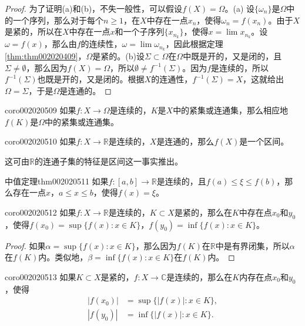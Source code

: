 \begin{proof}
为了证明(a)和(b)，不失一般性，可以假设$f(X) = \Omega$。(a) 设$\{\omega_n\}$是$\Omega$中的一个序列，那么对于每个$n \ge 1$，在$X$中存在一点$x_n$，使得$\omega_n = f(x_n)$。由于$X$是紧的，所以在$X$中存在一点$x$和一个子序列$\{x_{n_k}\}$，使得$x = \lim{x_{n_k}}$。设$\omega = f(x)$，那么由$f$的连续性，$\omega = \lim{\omega_{n_k}}$，因此根据定理\ref{thm:thm002020409}，$\Omega$是紧的。(b)设$\Sigma \subset \Omega$在$\Omega$中既是开的，又是闭的，且$\Sigma \neq \emptyset$，那么因为$f(X) = \Omega$，所以$\emptyset \neq f^{-1}(\Sigma)$。因为$f$是连续的，所以$f^{-1}(\Sigma)$也既是开的，又是闭的。根据$X$的连通性，$f^{-1}(\Sigma) = X$，这就给出$\Omega = \Sigma$，于是$\Omega$是连通的。
\end{proof}

\begin{corollary}{}{coro002020509}
如果$f:X \to \Omega$是连续的，$K$是$X$中的紧集或连通集，那么相应地$f(K)$是$\Omega$中的紧集或连通集。
\end{corollary}

\begin{corollary}{}{coro002020510}
如果$f:X \to \mathbb{R}$是连续的，$X$是连通的，那么$f(X)$是一个区间。
\end{corollary}

这可由$\mathbb{R}$的连通子集的特征是区间这一事实推出。

\begin{theorem}{中值定理}{thm002020511}
如果$f:[a, b] \to \mathbb{R}$是连续的，且$f(a) \le \xi \le f(b)$，那么存在一点$x$，$a \le x \le b$，使得$f(x) = \xi$。
\end{theorem}

\begin{corollary}{}{coro002020512}
如果$f:X \to \mathbb{R}$是连续的，$K \subset X$是紧的，那么在$K$中存在点$x_0$和$y_0$，使得$f(x_0) = \sup\{f(x):x \in K\}$，$f(y_0) = \inf\{f(x): x \in K\}$。
\end{corollary}

\begin{proof}
如果$\alpha = \sup\{f(x):x\in K\}$，那么因为$f(K)$在$\mathbb{R}$中是有界闭集，所以$\alpha$在$f(K)$内。类似地，$\beta = \inf\{f(x): x \in K\}$在$f(K)$内。
\end{proof}

\begin{corollary}{}{coro002020513}
如果$K \subset X$是紧的，$f: X \to \mathbb{C}$是连续的，那么在$K$内存在点$x_0$和$y_0$，使得
\[
\begin{aligned}
|f(x_0)| &= \sup\{|f(x)|:x \in K\},\\ 
|f(y_0)| &= \inf\{|f(x)|: x \in K\}.
\end{aligned}
\]
\end{corollary}

